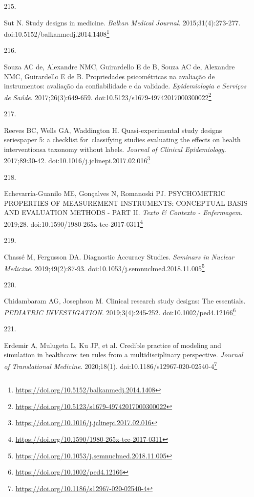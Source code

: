 \documentclass[
  a4paper,
]{book}
\newlength{\cslhangindent}
\newlength{\csllabelwidth}
\newlength{\cslentryspacingunit} %
\newenvironment{CSLReferences}[2] %
 {%
  \setlength{\parindent}{0pt}
  \ifodd #1
  \let\oldpar\par
  \def\par{\hangindent=\cslhangindent\oldpar}
  \fi
  \setlength{\parskip}{#2\cslentryspacingunit}
 }%
 {}
\newcommand{\CSLLeftMargin}[1]{\parbox[t]{\csllabelwidth}{#1}}
\newcommand{\CSLRightInline}[1]{\parbox[t]{\linewidth - \csllabelwidth}{#1}\break}
\renewcommand{\href}[2]{#2\footnote{\url{#1}}}
\begin{document}
\begin{CSLReferences}{0}{0}
\leavevmode{}%
\CSLLeftMargin{215. }%
\CSLRightInline{Sut N. Study designs in medicine. \emph{Balkan Medical Journal}. 2015;31(4):273-277. doi:\href{https://doi.org/10.5152/balkanmedj.2014.1408}{10.5152/balkanmedj.2014.1408}}

\leavevmode{}%
\CSLLeftMargin{216. }%
\CSLRightInline{Souza AC de, Alexandre NMC, Guirardello E de B, Souza AC de, Alexandre NMC, Guirardello E de B. Propriedades psicométricas na avaliação de instrumentos: avaliação da confiabilidade e da validade. \emph{Epidemiologia e Serviços de Saúde}. 2017;26(3):649-659. doi:\href{https://doi.org/10.5123/s1679-49742017000300022}{10.5123/s1679-49742017000300022}}

\leavevmode{}%
\CSLLeftMargin{217. }%
\CSLRightInline{Reeves BC, Wells GA, Waddington H. Quasi-experimental study designs series{\textemdash}paper 5: a checklist for~classifying studies evaluating the effects on health interventions{\textemdash}a taxonomy without labels. \emph{Journal of Clinical Epidemiology}. 2017;89:30-42. doi:\href{https://doi.org/10.1016/j.jclinepi.2017.02.016}{10.1016/j.jclinepi.2017.02.016}}

\leavevmode{}%
\CSLLeftMargin{218. }%
\CSLRightInline{Echevarría-Guanilo ME, Gonçalves N, Romanoski PJ. PSYCHOMETRIC PROPERTIES OF MEASUREMENT INSTRUMENTS: CONCEPTUAL BASIS AND EVALUATION METHODS - PART II. \emph{Texto \& Contexto - Enfermagem}. 2019;28. doi:\href{https://doi.org/10.1590/1980-265x-tce-2017-0311}{10.1590/1980-265x-tce-2017-0311}}

\leavevmode{}%
\CSLLeftMargin{219. }%
\CSLRightInline{Chassé M, Fergusson DA. Diagnostic Accuracy Studies. \emph{Seminars in Nuclear Medicine}. 2019;49(2):87-93. doi:\href{https://doi.org/10.1053/j.semnuclmed.2018.11.005}{10.1053/j.semnuclmed.2018.11.005}}

\leavevmode{}%
\CSLLeftMargin{220. }%
\CSLRightInline{Chidambaram AG, Josephson M. Clinical research study designs: The essentials. \emph{PEDIATRIC INVESTIGATION}. 2019;3(4):245-252. doi:\href{https://doi.org/10.1002/ped4.12166}{10.1002/ped4.12166}}

\leavevmode{}%
\CSLLeftMargin{221. }%
\CSLRightInline{Erdemir A, Mulugeta L, Ku JP, et al. Credible practice of modeling and simulation in healthcare: ten rules from a multidisciplinary perspective. \emph{Journal of Translational Medicine}. 2020;18(1). doi:\href{https://doi.org/10.1186/s12967-020-02540-4}{10.1186/s12967-020-02540-4}}


\end{CSLReferences}
\end{document}
